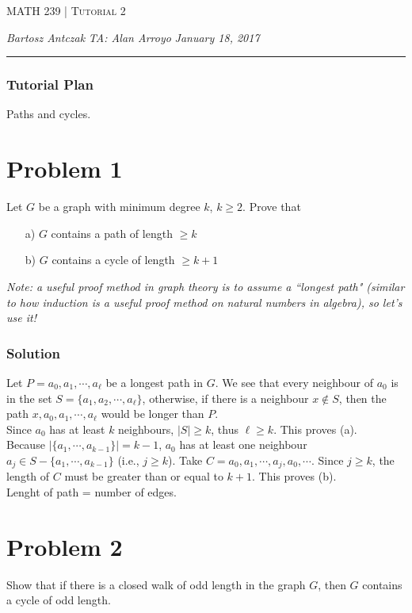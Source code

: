 \documentclass{report}
\newcommand{\lectureNum}{2}
\newcommand{\curDate}{January 18, 2017}
\newcommand{\course}{MATH 239}
\newcommand{\instructor}{Alan Arroyo}
\begin{document}
\begin{center}
\begin{Large}
\textsc{\course{} | Tutorial \lectureNum{}}
\end{Large}
\end{center} 
\noindent \textit{Bartosz Antczak} \hfill
\textit{TA: \instructor{}} \hfill
\textit{\curDate{}}
\rule{\textwidth}{0.4pt}

\subsubsection{Tutorial Plan}
Paths and cycles.
\section*{Problem 1}
Let $G$ be a graph with minimum degree $k$, $k \geq 2$. Prove that
\begin{itemize}
\item[a)] $G$ contains a path of length $\geq k$
\item[b)] $G$ contains a cycle of length $\geq k+1$
\end{itemize}
\textit{Note: a useful proof method in graph theory is to assume a ``longest path" (similar to how induction is a useful proof method on natural numbers in algebra), so let's use it!}
\subsubsection{Solution}
Let $P = a_0, a_1, \cdots, a_\ell$ be a longest path in $G$. We see that every neighbour of $a_0$ is in the set $S = \{a_1, a_2, \cdots, a_\ell\}$, otherwise, if there is a neighbour $x \notin S$, then the path $x, a_0, a_1, \cdots, a_\ell$ would be longer than $P$. \\
Since $a_0$ has at least $k$ neighbours, $\vert S \vert \geq k$, thus $\ell \geq k$. This proves (a).\\
Because $\vert\{a_1, \cdots, a_{k-1}\}\vert = k-1$, $a_0$ has at least one neighbour $a_j \in S - \{a_1, \cdots, a_{k-1}\}$ (i.e., $j \geq k$). Take $C=a_0,a_1, \cdots, a_j, a_0, \cdots$. Since $j \geq k$, the length of $C$ must be greater than or equal to $k+1$. This proves (b).\\
Lenght of path = number of edges. 

\section*{Problem 2}
Show that if there is a closed walk of odd length in the graph $G$, then $G$ contains a cycle of odd length.
\end{document}
